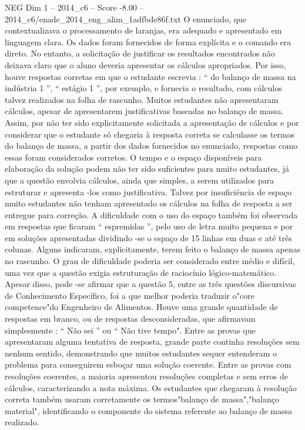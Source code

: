 \begin{textsample}{NEG Dim 1 – 2014\_c6 – Score -8.00 – 2014\_c6/enade\_2014\_eng\_alim\_1adfbde86f.txt}
O enunciado, que contextualizava o processamento de laranjas, era adequado e apresentado em linguagem clara.
Os dados foram fornecidos de forma explícita e o comando era direto.
No entanto, a solicitação de justificar os resultados encontrados não deixava claro que o aluno deveria apresentar os cálculos apropriados.
Por isso, houve respostas corretas em que o estudante escrevia : “ do balanço de massa na indústria 1 ”, “ estágio 1 ”, por exemplo, e fornecia o resultado, com cálculos talvez realizados na folha de rascunho.
Muitos estudantes não apresentaram cálculos, apesar de apresentarem justificativas baseadas no balanço de massa.
Assim, por não ter sido explicitamente solicitada a apresentação de cálculos e por considerar que o estudante só chegaria à resposta correta se calculasse os termos do balanço de massa, a partir dos dados fornecidos no enunciado, respostas como essas foram considerados corretos.
O tempo e o espaço disponíveis para elaboração da solução podem não ter sido suficientes para muito estudantes, já que a questão envolvia cálculos, ainda que simples, a serem utilizados para estruturar e apresenta -los como justificativa.
Talvez por insuficiência de espaço muito estudantes não tenham apresentado os cálculos na folha de resposta a ser entregue para correção.
A dificuldade com o uso do espaço também foi observada em respostas que ficaram “ espremidas ”, pelo uso de letra muito pequena e por em soluções apresentadas dividindo -se o espaço de 15 linhas em duas e até três colunas.
Alguns indicaram, explicitamente, terem feito o balanço de massa apenas no rascunho.
O grau de dificuldade poderia ser considerado entre médio e difícil, uma vez que a questão exigia estruturação de raciocínio lógico-matemático.
Apesar disso, pode -se afirmar que a questão 5, entre as três questões discursivas de Conhecimento Específico, foi a que melhor poderia traduzir o"core competence"do Engenheiro de Alimentos.
Houve uma grande quantidade de respostas em branco, ou de respostas desconsideradas, que afirmavam simplesmente : “ Não sei ” ou “ Não tive tempo".
Entre as provas que apresentaram alguma tentativa de resposta, grande parte continha resoluções sem nenhum sentido, demonstrando que muitos estudantes sequer entenderam o problema para conseguirem esboçar uma solução coerente.
Entre as provas com resoluções coerentes, a maioria apresentou resoluções completas e sem erros de cálculos, caracterizando a nota máxima.
Os estudantes que chegaram à resolução correta também usaram corretamente os termos"balanço de massa","balanço material", identificando o componente do sistema referente ao balanço de massa realizado.

\end{textsample}
